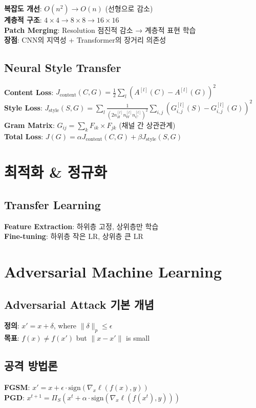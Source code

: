 \documentclass[6pt,landscape,a4paper]{article}
\begin{document}
\begin{multicols}{3}
\textbf{복잡도 개선}: $O(n^2) \rightarrow O(n)$ (선형으로 감소)\\
\textbf{계층적 구조}: $4 \times 4 \rightarrow 8 \times 8 \rightarrow 16 \times 16$\\
\textbf{Patch Merging}: Resolution 점진적 감소 → 계층적 표현 학습\\
\textbf{장점}: CNN의 지역성 + Transformer의 장거리 의존성

\subsection{Neural Style Transfer}
\textbf{Content Loss}: $J_{\text{content}}(C,G) = \frac{1}{2}\sum_l (A^{[l]}(C) - A^{[l]}(G))^2$\\
\textbf{Style Loss}: $J_{\text{style}}(S,G) = \sum_l \frac{1}{(2n_H^{[l]}n_W^{[l]}n_C^{[l]})^2} \sum_{i,j} (G_{i,j}^{[l]}(S) - G_{i,j}^{[l]}(G))^2$\\
\textbf{Gram Matrix}: $G_{ij} = \sum_k F_{ik} \times F_{jk}$ (채널 간 상관관계)\\
\textbf{Total Loss}: $J(G) = \alpha J_{\text{content}}(C,G) + \beta J_{\text{style}}(S,G)$

\section{최적화 \& 정규화}
\subsection{Transfer Learning}
\textbf{Feature Extraction}: 하위층 고정, 상위층만 학습\\
\textbf{Fine-tuning}: 하위층 작은 LR, 상위층 큰 LR
\section{Adversarial Machine Learning}
\subsection{Adversarial Attack 기본 개념}
\textbf{정의}: $x' = x + \delta$, where $\|\delta\|_p \leq \epsilon$\\
\textbf{목표}: $f(x) \neq f(x')$ but $\|x - x'\|$ is small

\subsection{공격 방법론}
\textbf{FGSM}: $x' = x + \epsilon \cdot \text{sign}(\nabla_x \ell(f(x), y))$\\
\textbf{PGD}: $x^{t+1} = \Pi_{S}(x^t + \alpha \cdot \text{sign}(\nabla_x \ell(f(x^t), y)))$


\end{multicols}
\end{document}
